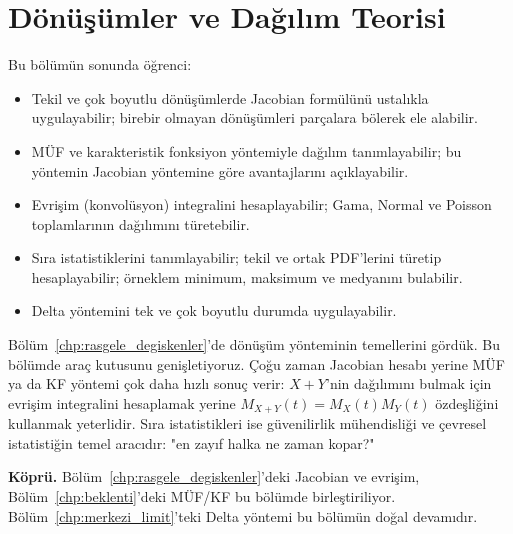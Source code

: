 \chapter{Dönüşümler ve Dağılım Teorisi}
\label{chp:donusumler}


\begin{kazanimlar}
Bu bölümün sonunda öğrenci:
\begin{itemize}
  \item Tekil ve çok boyutlu dönüşümlerde Jacobian formülünü ustalıkla uygulayabilir;
        birebir olmayan dönüşümleri parçalara bölerek ele alabilir.
  \item MÜF ve karakteristik fonksiyon yöntemiyle dağılım tanımlayabilir;
        bu yöntemin Jacobian yöntemine göre avantajlarını açıklayabilir.
  \item Evrişim (konvolüsyon) integralini hesaplayabilir; Gama, Normal ve Poisson
        toplamlarının dağılımını türetebilir.
  \item Sıra istatistiklerini tanımlayabilir; tekil ve ortak PDF'lerini türetip
        hesaplayabilir; örneklem minimum, maksimum ve medyanını bulabilir.
  \item Delta yöntemini tek ve çok boyutlu durumda uygulayabilir.
\end{itemize}
\end{kazanimlar}

\begin{motivasyon}
Bölüm~\ref{chp:rasgele_degiskenler}'de dönüşüm yönteminin temellerini gördük.
Bu bölümde araç kutusunu genişletiyoruz. Çoğu zaman Jacobian hesabı yerine
MÜF ya da KF yöntemi çok daha hızlı sonuç verir: $X+Y$'nin dağılımını bulmak için
evrişim integralini hesaplamak yerine $M_{X+Y}(t) = M_X(t)M_Y(t)$ özdeşliğini
kullanmak yeterlidir. Sıra istatistikleri ise güvenilirlik mühendisliği ve
çevresel istatistiğin temel aracıdır: "en zayıf halka ne zaman kopar?"

\medskip
\textbf{Köprü.} Bölüm~\ref{chp:rasgele_degiskenler}'deki Jacobian ve evrişim,
Bölüm~\ref{chp:beklenti}'deki MÜF/KF bu bölümde birleştiriliyor.
Bölüm~\ref{chp:merkezi_limit}'teki Delta yöntemi bu bölümün doğal devamıdır.
\end{motivasyon}

